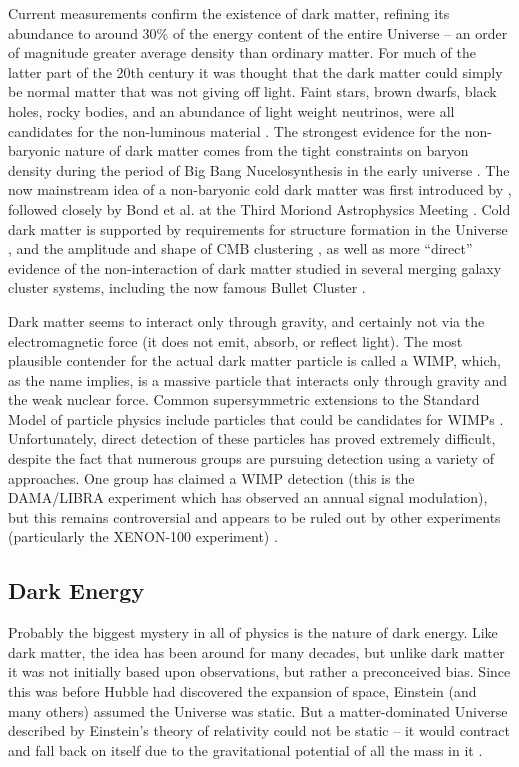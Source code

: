 Current measurements confirm the existence of dark matter, refining its abundance to around 30\% of the energy content of the entire Universe -- an order of magnitude greater average density than ordinary matter. For much of the latter part of the 20th century it was thought that the dark matter could simply be normal matter that was not giving off light. Faint stars, brown dwarfs, black holes, rocky bodies, and an abundance of light weight neutrinos, were all candidates for the non-luminous material \citep{Bergh99}. The strongest evidence for the non-baryonic nature of dark matter comes from the tight constraints on baryon density during the period of Big Bang Nucelosynthesis in the early universe \citep{Alpher48}. The now mainstream idea of a non-baryonic cold dark matter was first introduced by \citet{Peebles82}, followed closely by Bond et al. at the Third Moriond Astrophysics Meeting \citep{Bond83}. Cold dark matter is supported by requirements for structure formation in the Universe \citep{Peebles82}, and the amplitude and shape of \ac{CMB} clustering \citep{White95}, as well as more ``direct'' evidence of the non-interaction of dark matter studied in several merging galaxy cluster systems, including the now famous Bullet Cluster \citep[][see also \autoref{sec:ClusterAstro}]{Clowe06}.

Dark matter seems to interact only through gravity, and certainly not via the electromagnetic force (it does not emit, absorb, or reflect light). The most plausible contender for the actual dark matter particle is called a \acf{WIMP}, which, as the name implies, is a massive particle that interacts only through gravity and the weak nuclear force. Common supersymmetric extensions to the Standard Model of particle physics include particles that could be candidates for \ac{WIMP}s \citep{Schumann14}. Unfortunately, direct detection of these particles has proved extremely difficult, despite the fact that numerous groups are pursuing detection using a variety of approaches. One group has claimed a WIMP detection (this is the DAMA/LIBRA experiment which has observed an annual signal modulation), but this remains controversial and appears to be ruled out by other experiments (particularly the XENON-100 experiment) \citep{Snowmass13}.

\subsection{Dark Energy}
\label{sec:DE}

Probably the biggest mystery in all of physics is the nature of dark energy. Like dark matter, the idea has been around for many decades, but unlike dark matter it was not initially based upon observations, but rather a preconceived bias. Since this was before Hubble had discovered the expansion of space, Einstein (and many others) assumed the Universe was static. But a matter-dominated Universe described by Einstein's theory of relativity could not be static -- it would contract and fall back on itself due to the gravitational potential of all the mass in it \citep{Einstein17,Weinberg13}. 


